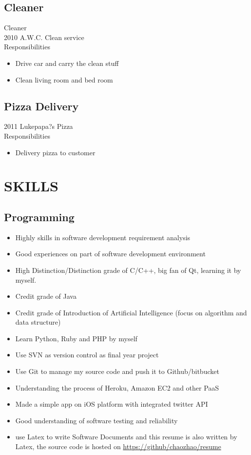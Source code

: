 \documentclass{article}
\begin{document}
\subsection*{Cleaner}
Cleaner\\
2010 A.W.C. Clean service\\
Responsibilities\\
\begin{itemize}
	\item  Drive car and carry the clean stuff
	\item Clean living room and bed room
\end{itemize}
\subsection*{Pizza Delivery}
2011 Lukepapa?s Pizza\\
Responsibilities\\
\begin{itemize}
	\item  Delivery pizza to customer
\end{itemize}

\section*{SKILLS}
\subsection*{Programming}
	
	\begin{itemize}
	\item Highly skills in software development requirement analysis
	\item Good experiences on part of software development environment
	\item High Distinction/Distinction grade of C/C++, big fan of Qt, learning it by myself.
	\item Credit grade of Java
	\item Credit grade of Introduction of Artificial Intelligence (focus on algorithm and data structure)
	\item Learn Python, Ruby and PHP by myself
	\item Use SVN as version control as final year project
	\item Use Git to manage my source code and push it to Github/bitbucket
	\item Understanding the process of Heroku, Amazon EC2 and other PaaS
	\item Made a simple app on iOS platform with integrated twitter API
	\item Good understanding of software testing and reliability
	\item use Latex to write Software Documents and this resume is also written by Latex, the source code is hosted on \url{ https://github/chaozhao/resume}
	\end{itemize}
\end{document}
